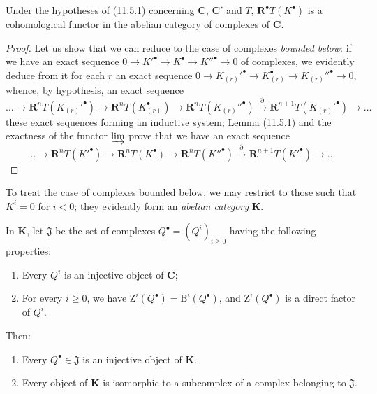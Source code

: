 \begin{proposition}[11.5.2]
\label{0.11.5.2}
Under the hypotheses of \textup{(\hyperref[0.11.5.1]{11.5.1})} concerning
$\boldsymbol{C}$, $\boldsymbol{C}'$ and $T$, $\mathbf R^\bullet T(K^\bullet)$ is a
cohomological functor in the abelian category of complexes of
$\boldsymbol{C}$.
\end{proposition}

\begin{proof}
Let us show that we can reduce to the case of complexes \emph{bounded below}:
if we have an exact sequence $0\longrightarrow K'^\bullet\longrightarrow K^\bullet\longrightarrow K''^\bullet\longrightarrow0$
of complexes, we evidently deduce from it for each $r$ an exact sequence $0\longrightarrow K_{(r)}'^\bullet\longrightarrow K_{(r)}^\bullet\longrightarrow K_{(r)}''^\bullet\longrightarrow0$,
whence, by hypothesis, an exact sequence
\[
  \ldots\longrightarrow\mathbf R^nT(K_{(r)}'^\bullet)
  \longrightarrow\mathbf R^nT(K_{(r)}^\bullet)
  \longrightarrow\mathbf R^nT(K_{(r)}''^\bullet)
  \xrightarrow{\partial}\mathbf R^{n+1}T(K_{(r)}'^\bullet)
  \longrightarrow\ldots
\]
these exact sequences forming an inductive system; Lemma
(\hyperref[0.11.5.1]{11.5.1}) and the exactness of the functor $\varinjlim$
prove that we have an exact sequence
\[
  \ldots\longrightarrow\mathbf R^nT(K'^\bullet)
  \longrightarrow\mathbf R^nT(K^\bullet)
  \longrightarrow\mathbf R^nT(K''^\bullet)
  \xrightarrow{\partial}\mathbf R^{n+1}T(K'^\bullet)
  \longrightarrow\ldots
\]
\end{proof}

To treat the case of complexes bounded below, we may restrict to
those such that $K^i=0$ for $i<0$; they evidently form an \emph{abelian
category} $\boldsymbol{K}$.

\begin{lemma}[11.5.2.1]
\label{0.11.5.2.1}
In $\boldsymbol{K}$, let $\mathfrak J$ be the set of complexes
$Q^\bullet=(Q^i)_{i\geq0}$ having the
following properties:
\begin{enumerate}
  \item[$1^\circ$] Every $Q^i$ is an injective object of $\boldsymbol{C}$;
  \item[$2^\circ$] For every $i\geq0$, we have
    $\mathrm Z^i(Q^\bullet)=\mathrm B^i(Q^\bullet)$, and
    $\mathrm Z^i(Q^\bullet)$ is a direct factor of $Q^i$.
\end{enumerate}
Then:
\begin{enumerate}
  \item[\textup{(i)}] Every $Q^\bullet\in\mathfrak J$ is an injective object of
    $\boldsymbol{K}$.
  \item[\textup{(ii)}] Every object of $\boldsymbol{K}$ is isomorphic to a subcomplex
    of a complex belonging to $\mathfrak J$.
\end{enumerate}
\end{lemma}

